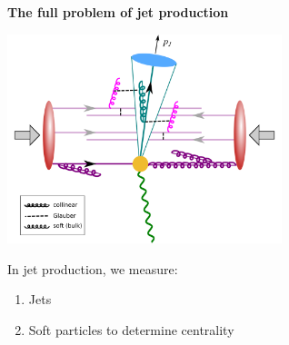 \documentclass[9pt,a4paper,unknownkeysallowed,xcolor=dvipsnames,aspectratio=43]{beamer}
\begin{document}
%
%
\begin{frame}{\bf\huge The full problem of jet production}
\vspace{4mm}
\begin{center}
\includegraphics[width=0.6\textwidth]{fig/AA}\\
\end{center}
\vspace{2mm}
{\large In jet production, we measure:}
\begin{enumerate}
    \item{\large Jets}
    \item{\large Soft particles to determine centrality}
\end{enumerate}
\end{frame}
%
%
\end{document}
